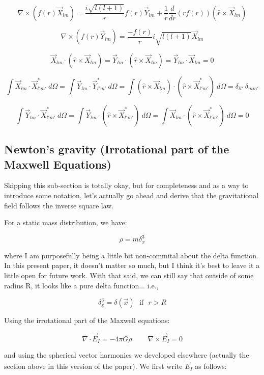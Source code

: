 \documentclass {article}
\begin{document}
$$\nabla \times \left( f(r) \vec X_{lm} \right) = \frac {i \sqrt{l(l+1)} } {r} f(r) \vec Y_{lm} + \frac 1 r \frac d {dr} \left( r f(r) \right) \left( \hat r \times \vec X_{lm} \right)$$

$$\nabla \times \left( f(r) \vec Y_{lm} \right) = \frac {- f(r)} r i \sqrt {l (l+1)} \vec X_{lm}$$

$$ \vec X_{lm} \cdot ( \hat r \times \vec X_{lm}) = \vec Y_{lm} \cdot  ( \hat r \times \vec X_{lm}) = \vec Y_{lm} \cdot \vec X_{lm} = 0$$ 

$$ \int \vec X_{lm} \cdot \vec X_{l' m'}^* ~ d \Omega  = \int \vec Y_{lm} \cdot \vec Y_{l' m'}^* ~ d \Omega  = \int ( \hat r \times \vec X_{lm}) \cdot ( \hat r \times \vec X_{l' m'}^*) ~ d \Omega  = \delta_{ll'} ~ \delta_{m m'} $$

$$\int \vec Y_{lm} \cdot \vec X_{l' m'}^* ~ d \Omega = \int \vec Y_{lm} \cdot ( \hat r \times \vec X_{l' m'}^* ) ~ d \Omega  =  \int \vec X_{lm} \cdot ( \hat r \times \vec X_{l' m'}^* ) ~ d \Omega   = 0 $$

\newpage
\subsection{Newton's gravity (Irrotational part of the Maxwell Equations)}

Skipping this sub-section is totally okay, but for completeness and as a way to introduce some notation, let's actually go ahead and derive that the gravitational field follows the inverse square law. 

For a static mass distribution, we have:

$$\rho = m \delta^3_x  $$

where I am purposefully being a little bit non-commital about the delta function. In this present paper, it doesn't matter so much, but I think it's best to leave it a little open for future work. With that said, we can still say that outside of some radius R, it looks like a pure delta function... i.e.,

$$\delta^3_x = \delta(\vec x) ~~~ \textrm{if} ~~~ r > R $$

Using the irrotational part of the Maxwell equations:

$$\nabla \cdot \vec{E}_I = -4 \pi G \rho ~~~~~~~~~~ \nabla \times \vec{E}_I = 0$$

and using the spherical vector harmonics we developed elsewhere (actually the section above in this version of the paper).  We first write $\vec E_I $ as follows:
\end{document}
